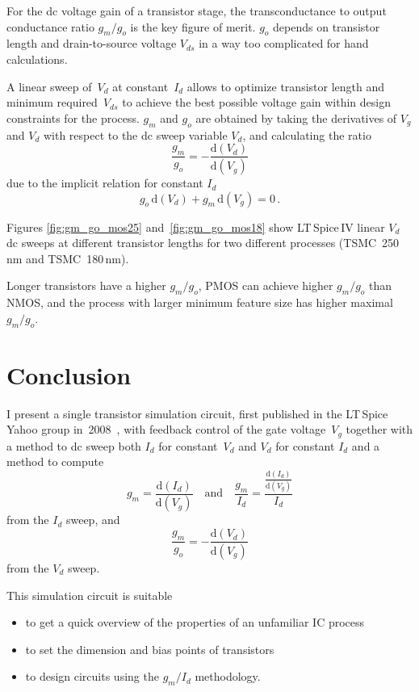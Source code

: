 \documentclass[journal]{IEEEtran}
\def\le{\left}
\def\ri{\right}
\begin{document}
For the dc voltage gain of a transistor stage, 
the transconductance to output conductance ratio $g_m/g_o$ is the key figure of merit.
$g_o$ depends on transistor length and drain-to-source voltage $V_{d{s}}$ 
in a way too complicated for hand calculations. 

A linear sweep of~$V_d$ at constant~$I_d$ allows to optimize transistor length 
and minimum required~$V_{d{s}}$ to achieve the best possible voltage gain
within design constraints for the process. 
$g_m$ and $g_o$ are obtained by taking the derivatives of $V_g$ and $V_d$ with respect to the dc sweep variable $V_d$, and calculating the ratio
\begin{equation}
\frac{g_m}{g_o} = -\frac{\mathrm{d}\le(V_d\ri)}{\mathrm{d}\le(V_g\ri)}
\end{equation}
due to the implicit relation for constant $I_d$
\begin{equation}
g_o\,\mathrm{d}\le(V_d\ri) + g_m\,\mathrm{d}\le(V_g\ri) = 0\,.
\end{equation}

Figures \ref{fig:gm_go_mos25} and~\ref{fig:gm_go_mos18}
show LT\,Spice\,IV linear $V_d$ dc sweeps at different transistor lengths for two different processes 
(TSMC~250\,nm and TSMC~180\,nm).

Longer transistors have a higher $g_m/g_o$, PMOS can achieve higher $g_m/g_o$ than NMOS,
and the process with larger minimum feature size has higher maximal $g_m/g_o$.

\section{Conclusion}
I present a single transistor simulation circuit, 
first published in the LT\,Spice Yahoo group in~2008~\cite{Yahoo2008},
with feedback control of the gate voltage~$V_g$
together with a method to dc sweep both 
$I_d$ for constant~$V_d$ and $V_d$ for constant $I_d$
and a method to compute 
\begin{equation}
g_m = \frac{\mathrm{d}\le(I_d\ri)}{\mathrm{d}\le(V_g\ri)} \quad\mathrm{and}\quad
\frac{g_m}{I_d} = \frac{\frac{\mathrm{d}\le(I_d\ri)}{\mathrm{d}\le(V_g\ri)}}{I_d}
\end{equation}
from the $I_d$ sweep, and
\begin{equation}
\frac{g_m}{g_o} = -\frac{\mathrm{d}\le(V_d\ri)}{\mathrm{d}\le(V_g\ri)}
\end{equation}
from the $V_d$ sweep. 

This simulation circuit is suitable
\begin{itemize}
\item to get a quick overview of the properties of an unfamiliar IC process
\item to set the dimension and bias points of transistors 
\item to design circuits using the $g_m/I_d$ methodology.~\cite{Silveira1996}
\end{itemize}
\end{document}
